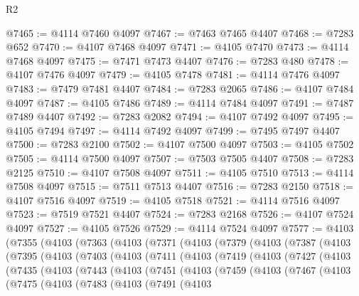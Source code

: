 \begin{lexlean}{R2}
\begin{coremodule}
@7465 := @4114 @7460 @4097
@7467 := @7463 @7465 @4407
@7468 := @7283 @652
@7470 := @4107 @7468 @4097
@7471 := @4105 @7470
@7473 := @4114 @7468 @4097
@7475 := @7471 @7473 @4407
@7476 := @7283 @480
@7478 := @4107 @7476 @4097
@7479 := @4105 @7478
@7481 := @4114 @7476 @4097
@7483 := @7479 @7481 @4407
@7484 := @7283 @2065
@7486 := @4107 @7484 @4097
@7487 := @4105 @7486
@7489 := @4114 @7484 @4097
@7491 := @7487 @7489 @4407
@7492 := @7283 @2082
@7494 := @4107 @7492 @4097
@7495 := @4105 @7494
@7497 := @4114 @7492 @4097
@7499 := @7495 @7497 @4407
@7500 := @7283 @2100
@7502 := @4107 @7500 @4097
@7503 := @4105 @7502
@7505 := @4114 @7500 @4097
@7507 := @7503 @7505 @4407
@7508 := @7283 @2125
@7510 := @4107 @7508 @4097
@7511 := @4105 @7510
@7513 := @4114 @7508 @4097
@7515 := @7511 @7513 @4407
@7516 := @7283 @2150
@7518 := @4107 @7516 @4097
@7519 := @4105 @7518
@7521 := @4114 @7516 @4097
@7523 := @7519 @7521 @4407
@7524 := @7283 @2168
@7526 := @4107 @7524 @4097
@7527 := @4105 @7526
@7529 := @4114 @7524 @4097
@7577 := @4103
    (@7355
      (@4103
        (@7363
          (@4103
            (@7371
              (@4103
                (@7379
                  (@4103
                    (@7387
                      (@4103
                        (@7395
                          (@4103
                            (@7403
                              (@4103
                                (@7411
                                  (@4103
                                    (@7419
                                      (@4103
                                        (@7427
                                          (@4103
                                            (@7435
                                              (@4103
                                                (@7443
                                                  (@4103
                                                    (@7451
                                                      (@4103
                                                        (@7459
                                                          (@4103
                                                            (@7467
                                                              (@4103
                                                                (@7475
                                                                  (@4103
                                                                    (@7483
                                                                      (@4103
                                                                        (@7491
                                                                          (@4103

\end{coremodule}
\end{lexlean}
